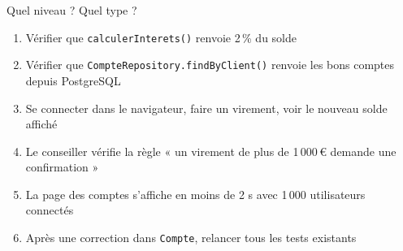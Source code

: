 \documentclass[aspectratio=169,10pt]{beamer}
\begin{document}
\begin{frame}{Quel niveau ? Quel type ?}
  \small
  \begin{enumerate}
    \item Vérifier que \texttt{calculerInterets()} renvoie 2\,\% du solde
    \item Vérifier que \texttt{CompteRepository.findByClient()} renvoie les bons comptes depuis PostgreSQL
    \item Se connecter dans le navigateur, faire un virement, voir le nouveau solde affiché
    \item Le conseiller vérifie la règle « un virement de plus de 1\,000\,\euro{} demande une confirmation »
    \item La page des comptes s'affiche en moins de 2 s avec 1\,000 utilisateurs connectés
    \item Après une correction dans \texttt{Compte}, relancer tous les tests existants
  \end{enumerate}
\end{frame}
\end{document}
